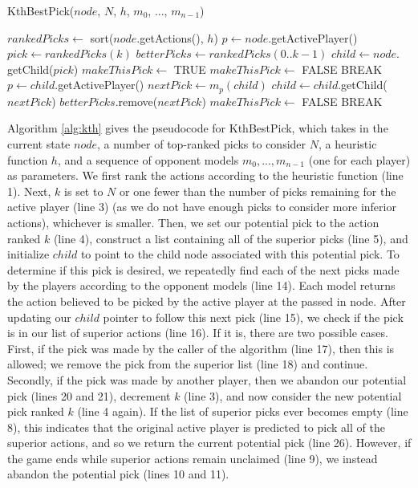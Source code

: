 \documentclass[letterpaper]{article}
\numberwithin{equation}{section}
\numberwithin{theorem}{section}
\numberwithin{lemma}{section}
\numberwithin{df}{section}
\begin{document}
\begin{algorithm}[t]
	\caption{KthBestPick($node$, $N$, $h$, $m_0$, ..., $m_{n-1}$)}
	\label{alg:kth}
	\begin{footnotesize}
	\begin{algorithmic}[1]
		\STATE $rankedPicks \gets $ sort($node$.getActions(), $h$)
		\STATE $p \gets node$.getActivePlayer()
			\STATE $pick \gets rankedPicks(k)$
			\STATE $betterPicks \gets rankedPicks(0..k-1)$
			\STATE $child \gets node.$getChild($pick$)
			\STATE $makeThisPick \gets $ TRUE
					\STATE $makeThisPick \gets $ FALSE
					\STATE BREAK
				\ENDIF
				\STATE $p \gets child$.getActivePlayer()
				\STATE $nextPick \gets m_p(child)$
				\STATE $child \gets child.$getChild($nextPick$)
						\STATE $betterPicks.$remove($nextPick$)
					\ELSE
						\STATE $makeThisPick \gets $ FALSE
						\STATE BREAK
					\ENDIF
				\ENDIF
			\ENDWHILE
			\ENDIF
		\ENDFOR
	\end{algorithmic}
	\end{footnotesize}
\end{algorithm}

Algorithm \ref{alg:kth} gives the pseudocode for KthBestPick, which takes in the current state $node$, a number of top-ranked picks to consider $N$, a heuristic function $h$, and a sequence of opponent models $m_0, ..., m_{n-1}$ (one for each player) as parameters.  We first rank the actions according to the heuristic function (line 1).  Next, $k$ is set to $N$ or one fewer than the number of picks remaining for the active player (line 3) (as we do not have enough picks to consider more inferior actions), whichever is smaller.  Then, we set our potential pick to the action ranked $k$ (line 4), construct a list containing all of the superior picks (line 5), and initialize $child$ to point to the child node associated with this potential pick.  To determine if this pick is desired, we repeatedly find each of the next picks made by the players according to the opponent models (line 14).  Each model returns the action believed to be picked by the active player at the passed in node.  After updating our $child$ pointer to follow this next pick (line 15), we check if the pick is in our list of superior actions (line 16).  If it is, there are two possible cases.  First, if the pick was made by the caller of the algorithm (line 17), then this is allowed; we remove the pick from the superior list (line 18) and continue.  Secondly, if the pick was made by another player, then we abandon our potential pick (lines 20 and 21), decrement $k$ (line 3), and now consider the new potential pick ranked $k$ (line 4 again).  If the list of superior picks ever becomes empty (line 8), this indicates that the original active player is predicted to pick all of the superior actions, and so we return the current potential pick (line 26).  However, if the game ends while superior actions remain unclaimed (line 9), we instead abandon the potential pick (lines 10 and 11). 
\end{document}

